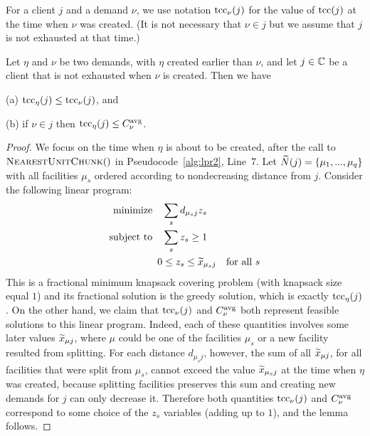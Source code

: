 \documentclass[11pt]{article}
\begin{document}

For a client $j$ and a demand $\nu$, we use notation $\textrm{tcc}_{\nu}(j)$ for the value of
$\textrm{tcc}(j)$ at the time when $\nu$ was created. (It is not necessary that $\nu\in j$ but 
we assume that $j$ is not exhausted at that time.)


\begin{lemma}\label{lem: tcc optimal}
  Let $\eta$ and $\nu$ be two demands, with $\eta$ created
  earlier than $\nu$, and let $j\in\mathbb{C}$ be a client
  that is not exhausted when $\nu$ is created. Then we have
\begin{description}
	\item{(a)} $\textrm{tcc}_\eta(j) \le \textrm{tcc}_{\nu}(j)$, and 
	\item{(b)} if $\nu\in j$ then $\textrm{tcc}_\eta(j) \le C^{{\mbox{\scriptsize\rm avg}}}_{\nu}$.
\end{description}
\end{lemma}

\begin{proof}
  We focus on the time when $\eta$ is about to be created,
  after the call to ${\textsc{NearestUnitChunk}}()$ in
  Pseudocode~\ref{alg:lpr2}, Line~7.  Let ${\widetilde N}(j) =
  \{\mu_1,...,\mu_q\}$ with all facilities $\mu_s$ ordered
  according to nondecreasing distance from $j$.  Consider
  the following linear program:
%
\begin{alignat*}{1}
	\textrm{minimize} \quad & \sum_s d_{\mu_s j}z_s
			\\
	\textrm{subject to} \quad & \sum_s z_s  \ge 1
			\\
 	0 &\le z_s \le {\widetilde x}_{\mu_s j} \quad \textrm{for all}\ s
\end{alignat*}
%
  This is a fractional
  minimum knapsack covering problem (with knapsack size equal $1$) and its fractional
  solution is the greedy solution, which is exactly
  $\textrm{tcc}_\eta(j)$.  On the other hand, we claim that
  $\textrm{tcc}_\nu(j)$ and $C^{{\mbox{\scriptsize\rm avg}}}_{\nu}$ both represent feasible
  solutions to this linear program. Indeed, each of these
  quantities involves some later values ${\widetilde x}_{\mu j}$,
  where $\mu$ could be one of the facilities $\mu_s$ or a
  new facility resulted from splitting. For each distance
  $d_{\mu_s j}$, however, the sum of all ${\widetilde x}_{\mu j}$,
  for all facilities that were split from $\mu_s$, cannot exceed
 the value ${\widetilde x}_{\mu_s j}$ at the time when
  $\eta$ was created, because splitting facilities preserves this sum and
 creating new demands for $j$ can only decrease it.
Therefore both quantities
  $\textrm{tcc}_\nu(j)$ and $C^{{\mbox{\scriptsize\rm avg}}}_{\nu}$ correspond to some
  choice of the $z_s$ variables (adding up to $1$), and the
  lemma follows.
\end{proof}
\end{document}
